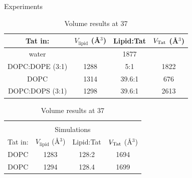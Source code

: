
\begin{table}[htbp]
  \centering
  Experiments\\
  \begin{tabular}{cccc}
    \hline
    Tat in: & $V_\textrm{lipid}$ (\AA$^3$) & Lipid:Tat & $V_\textrm{Tat}$ (\AA$^3$) \\
    \hline
    water & & 1877 \\
    DOPC:DOPE (3:1) & 1288 & 5:1 & 1822 \\
    DOPC & 1314 & 39.6:1 & 676 \\
    DOPC:DOPS (3:1) & 1298 & 39.6:1 & 2613 \\
    \hline 
  \end{tabular}
  \quad
  \begin{tabular}{cccc}
    & & & \\
    \multicolumn{4}{c}{Simulations} \\ 
    \hline
    Tat in: & $V_\textrm{lipid}$ (\AA$^3$) & Lipid:Tat & $V_\textrm{Tat}$ (\AA$^3$) \\
    \hline
    DOPC & 1283 & 128:2 & 1694 \\
    DOPC & 1294 & 128.4 & 1699 \\
    \hline
  \end{tabular}
  \caption{Volume results at 37 \textcelsius}
  \label{tb:volumes}
\end{table}

